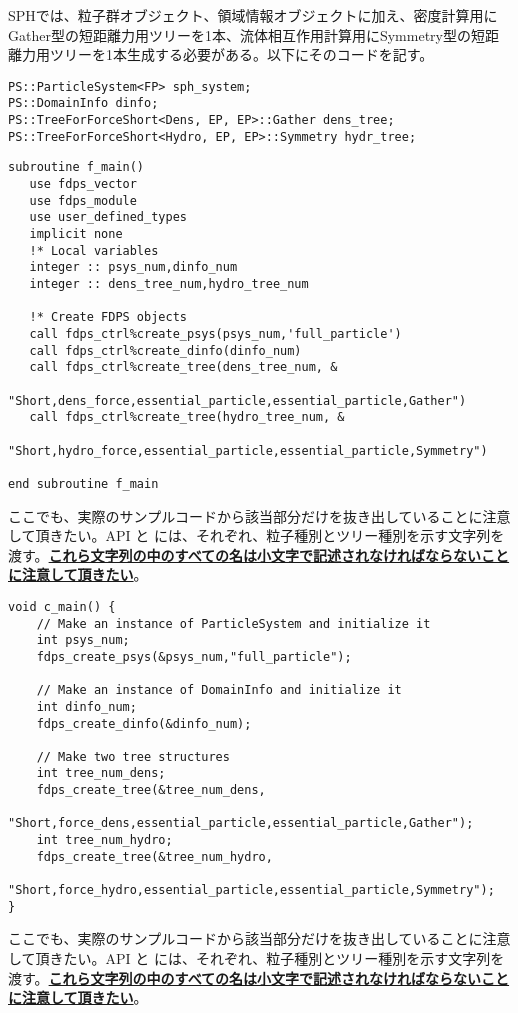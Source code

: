 SPHでは、粒子群オブジェクト、領域情報オブジェクトに加え、密度計算用にGather型の短距離力用ツリーを1本、流体相互作用計算用にSymmetry型の短距離力用ツリーを1本生成する必要がある。以下にそのコードを記す。
\ifCpp %
\begin{lstlisting}[caption=オブジェクトの生成]
PS::ParticleSystem<FP> sph_system;
PS::DomainInfo dinfo;
PS::TreeForForceShort<Dens, EP, EP>::Gather dens_tree;
PS::TreeForForceShort<Hydro, EP, EP>::Symmetry hydr_tree;
\end{lstlisting}
\endifCpp
\ifFtn %
\begin{lstlisting}[caption=オブジェクトの生成]
subroutine f_main()
   use fdps_vector
   use fdps_module
   use user_defined_types
   implicit none
   !* Local variables
   integer :: psys_num,dinfo_num
   integer :: dens_tree_num,hydro_tree_num
   
   !* Create FDPS objects
   call fdps_ctrl%create_psys(psys_num,'full_particle')
   call fdps_ctrl%create_dinfo(dinfo_num)
   call fdps_ctrl%create_tree(dens_tree_num, &
                              "Short,dens_force,essential_particle,essential_particle,Gather")
   call fdps_ctrl%create_tree(hydro_tree_num, &
                              "Short,hydro_force,essential_particle,essential_particle,Symmetry")

end subroutine f_main
\end{lstlisting}
ここでも、実際のサンプルコードから該当部分だけを抜き出していることに注意して頂きたい。API \createPsys と \createTree には、それぞれ、粒子種別とツリー種別を示す文字列を渡す。\textbf{\ul{これら文字列の中のすべての{\structure}名は小文字で記述されなければならないことに注意して頂きたい}}。
\endifFtn
\ifC %
\begin{lstlisting}[caption=オブジェクトの生成]
void c_main() {
    // Make an instance of ParticleSystem and initialize it
    int psys_num;
    fdps_create_psys(&psys_num,"full_particle");

    // Make an instance of DomainInfo and initialize it
    int dinfo_num;
    fdps_create_dinfo(&dinfo_num);
    
    // Make two tree structures
    int tree_num_dens;
    fdps_create_tree(&tree_num_dens,
                     "Short,force_dens,essential_particle,essential_particle,Gather");
    int tree_num_hydro;
    fdps_create_tree(&tree_num_hydro,
                     "Short,force_hydro,essential_particle,essential_particle,Symmetry");
}
\end{lstlisting}
ここでも、実際のサンプルコードから該当部分だけを抜き出していることに注意して頂きたい。API \createPsys と \createTree には、それぞれ、粒子種別とツリー種別を示す文字列を渡す。\textbf{\ul{これら文字列の中のすべての{\structure}名は小文字で記述されなければならないことに注意して頂きたい}}。
\endifC


